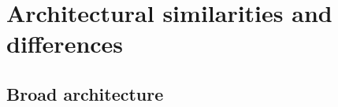 \documentclass[output=paper]{langsci/langscibook}
\begin{document}




\section{Architectural similarities and differences}

\subsection{Broad architecture}
\end{document}
